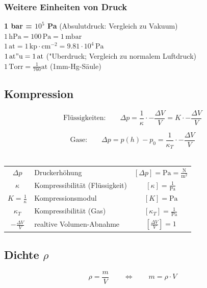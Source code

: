 	
	
	\subsubsection{Weitere Einheiten von Druck}
	\textbf{1 bar = $10^5$ Pa} \qquad (Absulutdruck: Vergleich zu Vakuum)\\
	$ 1 \, \mathrm{hPa} = 100 \, \mathrm{Pa} = 1 \, \mathrm{mbar}$ \\
	$1 \, \mathrm{at} = 1 \, \mathrm{kp \cdot cm^{-2}} = 9.81 \cdot 10^4 \, \mathrm{Pa}$  \\
	$1 \, \mathrm{at"u} = 1 \, \mathrm{at}$ ("Uberdruck; Vergleich zu normalem Luftdruck) \\
	$1 \, \mathrm{Torr} = \frac{1}{760} \mathrm{at}$ (1mm-Hg-Säule) \\


	
	


\subsection{Kompression}
	
	
	$$ \boxed{ \text{Flüssigkeiten:} \qquad \Delta p = \frac{1}{\kappa} \cdot - \frac{\Delta V}{V} = K \cdot - \frac{\Delta V}{V} } $$  
	
	$$ \boxed{  \text{Gase:} \qquad \Delta p = p(h) - p_0 = \frac{1}{\kappa_T} \cdot - \frac{\Delta V}{V} } $$ \\
	
	
	
	\begin{tabular}{c l c}
		$\Delta p$ & Druckerhöhung & $[\Delta p] = \mathrm{Pa = \frac{N}{m^2}}$ \\
		$\kappa$ & Kompressibilität (Flüssigkeit) & $[\kappa] = \mathrm{\frac{1}{Pa}}$ \\
		$K = \frac{1}{\kappa}$ & Kompressionsmodul & $[K] = \mathrm{Pa}$ \\
		$\kappa_T$ & Kompressibilität (Gas) & $[\kappa_T] = \mathrm{\frac{1}{Pa}}$ \\
		$- \frac{\Delta V}{V}$ & realtive Volumen-Abnahme & $[\frac{\Delta V}{V}] = 1$ 
	\end{tabular}
	
	
	
\subsection{Dichte $\rho$}

$$ \boxed{ \rho = \frac{m}{V} } \qquad \Leftrightarrow \qquad \boxed{ m = \rho \cdot V }$$	 


